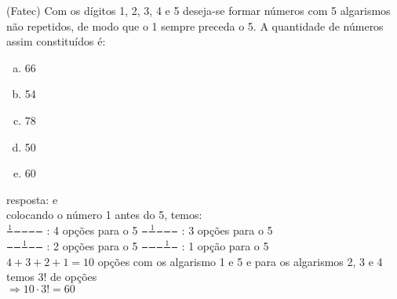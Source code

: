 \begin{ex}
	(Fatec) Com os dígitos 1, 2, 3, 4 e 5 deseja-se formar números com 5 algarismos não repetidos, de modo que o 1 sempre preceda o 5. A quantidade de números assim constituídos é:
    \begin{enumerate}[(a)]
    \item 66
    \item 54
    \item 78
    \item 50
    \item 60
    \end{enumerate}
     \begin{sol}
       resposta: e \\
       colocando o número 1 antes do 5, temos:\\
       $\frac{1}{\phantom{A}}\frac{\phantom{A}}{\phantom{A}}\frac{\phantom{A}}{\phantom{A}}\frac{\phantom{A}}{\phantom{A}}\frac{\phantom{A}}{\phantom{A}}$ : 4 opções para o 5  \hspace{0,5 cm} $\frac{\phantom{A}}{\phantom{A}}\frac{1}{\phantom{A}}\frac{\phantom{A}}{\phantom{A}}\frac{\phantom{A}}{\phantom{A}}\frac{\phantom{A}}{\phantom{A}}$ : 3 opções para o 5 \\
       $\frac{\phantom{A}}{\phantom{A}}\frac{\phantom{A}}{\phantom{A}}\frac{1}{\phantom{A}}\frac{\phantom{A}}{\phantom{1}}\frac{\phantom{A}}{\phantom{A}}$ : 2 opções para o 5  \hspace{0,5 cm}
       $\frac{\phantom{A}}{\phantom{A}}\frac{\phantom{A}}{\phantom{A}}\frac{\phantom{A}}{\phantom{A}}\frac{1}{\phantom{A}}\frac{\phantom{A}}{\phantom{A}}$ : 1 opção para o 5 \\
       $4+3+2+1= 10$ opções com os algarismo 1 e 5 e  para os algarismos 2, 3 e 4 temos $3!$ de opções\\
       $\Longrightarrow 10\cdot3!=60$
     \end{sol}
\end{ex}